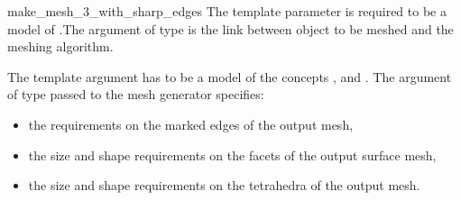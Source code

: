 \begin{ccRefFunction}{make_mesh_3_with_sharp_edges}
The template parameter  is required to be a model of
.The argument  of type
 is the link between object to be meshed and
the meshing algorithm.

The template argument  has to be a model of the concepts
,  and
. The argument of type 
passed to the mesh generator specifies:
\begin{itemize}
\item the requirements on the marked edges of the output mesh,
\item the size and shape requirements on the facets of the output surface
  mesh,
\item the size and shape requirements on the tetrahedra of the output mesh.
\end{itemize}

\ccSeeAlso
{}

\end{ccRefFunction}

\ccRefPageEnd

